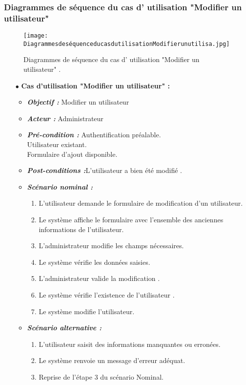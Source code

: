 \subsubsection{Diagrammes de séquence du cas d' utilisation "Modifier un utilisateur" }
\begin{figure}[ht]
	\centering
	\texttt{[image: DiagrammesdeséquenceducasdutilisationModifierunutilisa.jpg]}
	\caption{Diagrammes de séquence du cas d' utilisation "Modifier un utilisateur"  .}
	\label{fig:Diagrammes de séquence du cas d' utilisation Modifier un utilisateur }
\end{figure}
\FloatBarrier
{}
\begin{itemize}
	\item[$\bullet$] \textbf{Cas d’utilisation "Modifier un utilisateur" :} 
	\medskip
	\begin{itemize}
		\item \textit{\textbf{Objectif :}} Modifier un utilisateur 	
		\item \textit{\textbf{Acteur :}} Administrateur	
		\item \textit{\textbf{Pré-condition  :}} Authentification préalable.\\
		Utilisateur existant.\\
		Formulaire d’ajout disponible.
\\
		\item \textit{\textbf{Post-conditions   :}}L’utilisateur a bien été modifié .
		\item \textit{\textbf{Scénario nominal :}}
		\begin{enumerate}
			\item L’utilisateur demande le formulaire de modification d’un utilisateur.
			\item Le système affiche le formulaire avec l’ensemble des anciennes informations de l’utilisateur.
			\item L’administrateur modifie les champs nécessaires. 
			\item Le système vérifie les données saisies. 
			\item L’administrateur valide la modification . 
			\item Le système vérifie l’existence de l’utilisateur .  
			\item Le système modifie l’utilisateur.
		\end{enumerate}
		\item \textit{\textbf{Scénario alternative :}}
		\begin{enumerate}
			\item L’utilisateur saisit des informations manquantes ou erronées.
			\item  Le système renvoie un message d’erreur adéquat.
			\item Reprise de l’étape 3 du scénario Nominal.
		\end{enumerate}
	\end{itemize}
\end{itemize}	
\bigskip
